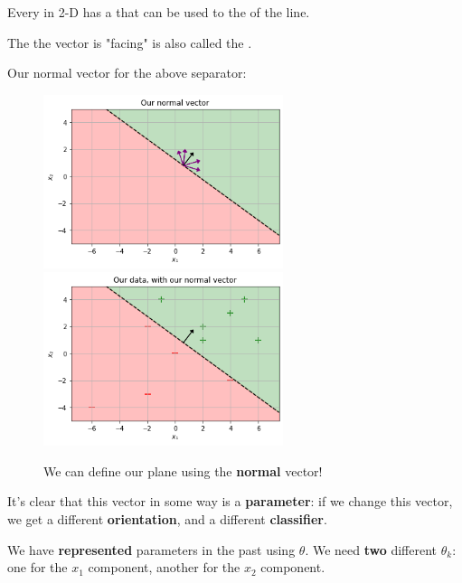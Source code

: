         \begin{concept}
            Every  in 2-D has a  that can be used to  the  of the line.
            
            The  the vector is "facing" is also called the .
        \end{concept}
        
        Our normal vector for the above separator:
        
        \begin{figure}[H]

                \includegraphics[width=70mm,scale=0.5]{images/classification_images/normal_vector_among_others.png}
                \includegraphics[width=70mm,scale=0.5]{images/classification_images/data_2d_separable_normal vector.png}
                
                \caption*{We can define our plane using the \textbf{normal} vector!}
        \end{figure}
        
        It's clear that this vector in some way is a \textbf{parameter}: if we change this vector, we get a different \textbf{orientation}, and a different \textbf{classifier}. 
        
        We have \textbf{represented} parameters in the past using $\theta$. We need \textbf{two} different $\theta_k$: one for the $x_1$ component, another for the $x_2$ component.
        
